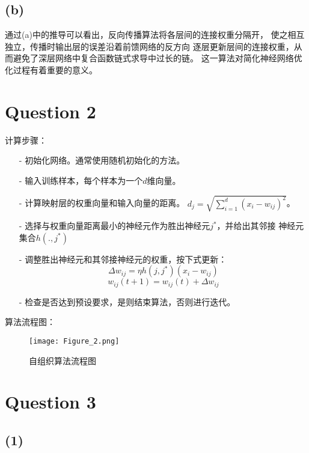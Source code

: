 \documentclass{article}
\newcommand{\question}[1]{\section*{Question #1}}
\renewcommand{\part}[1]{\subsection*{(#1)}}
\begin{document}
\part{b}
通过(a)中的推导可以看出，反向传播算法将各层间的连接权重分隔开，
使之相互独立，传播时输出层的误差沿着前馈网络的反方向
逐层更新层间的连接权重，从而避免了深层网络中复合函数链式求导中过长的链。
这一算法对简化神经网络优化过程有着重要的意义。

\question{2}
计算步骤：
\begin{itemize}
	\item[-] 初始化网络。通常使用随机初始化的方法。
	\item[-] 输入训练样本，每个样本为一个$d$维向量。
	\item[-] 计算映射层的权重向量和输入向量的距离。
		${d_j} = \sqrt {\sum\limits_{i = 1}^d {{{\left( {{x_i} - {w_{ij}}} \right)}^2}} } $。
	\item[-] 选择与权重向量距离最小的神经元作为胜出神经元${j^*}$，并给出其邻接
		神经元集合$h\left( {.,{j^*}} \right)$
	\item[-] 调整胜出神经元和其邻接神经元的权重，按下式更新：
	$$\Delta {w_{ij}} = \eta h\left( {j,{j^*}} \right)\left( {{x_i} - {w_{ij}}} \right)$$
	$${w_{ij}}\left( {t + 1} \right) = {w_{ij}}\left( t \right) + \Delta {w_{ij}}$$
	\item[-] 检查是否达到预设要求，是则结束算法，否则进行迭代。
\end{itemize}

算法流程图：
\begin{figure}[ht]
	\centering
	\texttt{[image: Figure\_2.png]}
	\caption{自组织算法流程图}
	\label{figl}
\end{figure}

\question{3}
\part{1}
\end{document}
